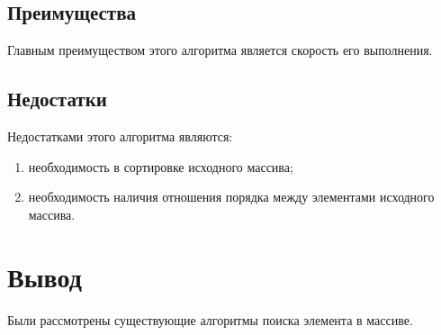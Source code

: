 \subsection{Преимущества}

Главным преимуществом этого алгоритма является скорость его выполнения.

\subsection{Недостатки}

Недостатками этого алгоритма являются:
\begin{enumerate}
    \item необходимость в сортировке исходного массива;
    \item необходимость наличия отношения порядка между элементами исходного массива.
\end{enumerate}

\section{Вывод}

Были рассмотрены существующие алгоритмы поиска элемента в массиве. 